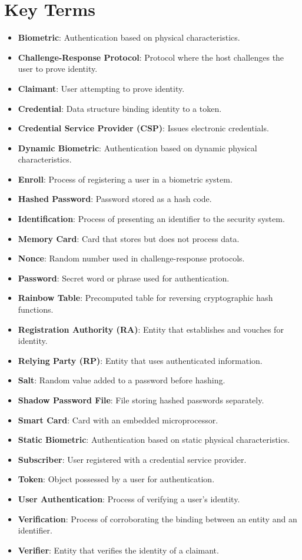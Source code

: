 \documentclass{article}
\begin{document}
\section{Key Terms}
\begin{itemize}
    \item \textbf{Biometric}: Authentication based on physical characteristics.
    \item \textbf{Challenge-Response Protocol}: Protocol where the host challenges the user to prove identity.
    \item \textbf{Claimant}: User attempting to prove identity.
    \item \textbf{Credential}: Data structure binding identity to a token.
    \item \textbf{Credential Service Provider (CSP)}: Issues electronic credentials.
    \item \textbf{Dynamic Biometric}: Authentication based on dynamic physical characteristics.
    \item \textbf{Enroll}: Process of registering a user in a biometric system.
    \item \textbf{Hashed Password}: Password stored as a hash code.
    \item \textbf{Identification}: Process of presenting an identifier to the security system.
    \item \textbf{Memory Card}: Card that stores but does not process data.
    \item \textbf{Nonce}: Random number used in challenge-response protocols.
    \item \textbf{Password}: Secret word or phrase used for authentication.
    \item \textbf{Rainbow Table}: Precomputed table for reversing cryptographic hash functions.
    \item \textbf{Registration Authority (RA)}: Entity that establishes and vouches for identity.
    \item \textbf{Relying Party (RP)}: Entity that uses authenticated information.
    \item \textbf{Salt}: Random value added to a password before hashing.
    \item \textbf{Shadow Password File}: File storing hashed passwords separately.
    \item \textbf{Smart Card}: Card with an embedded microprocessor.
    \item \textbf{Static Biometric}: Authentication based on static physical characteristics.
    \item \textbf{Subscriber}: User registered with a credential service provider.
    \item \textbf{Token}: Object possessed by a user for authentication.
    \item \textbf{User Authentication}: Process of verifying a user's identity.
    \item \textbf{Verification}: Process of corroborating the binding between an entity and an identifier.
    \item \textbf{Verifier}: Entity that verifies the identity of a claimant.
\end{itemize}
\newpage
\end{document}
